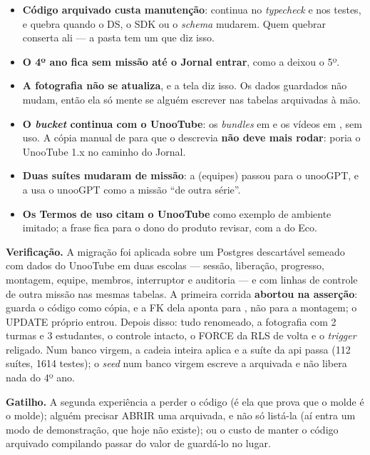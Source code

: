 \begin{itemize}
  \item \textbf{Código arquivado custa manutenção}: continua no \emph{typecheck}
    e nos testes, e quebra quando o DS, o SDK ou o \emph{schema} mudarem. Quem
    quebrar conserta ali --- a pasta tem um  que diz isso.
  \item \textbf{O 4º ano fica sem missão até o Jornal entrar}, como a
     deixou o 5º.
  \item \textbf{A fotografia não se atualiza}, e a tela diz isso. Os dados
    guardados não mudam, então ela só mente se alguém escrever nas tabelas
    arquivadas à mão.
  \item \textbf{O \emph{bucket} continua com o UnooTube}: os \emph{bundles} em
     e os vídeos em , sem uso. A
    cópia manual de  para  que o
     descrevia \textbf{não deve mais rodar}: poria o UnooTube
    1.x no caminho do Jornal.
  \item \textbf{Duas suítes mudaram de missão}: a  (equipes)
    passou para o unooGPT, e a  usa o unooGPT como a missão
    \enquote{de outra série}.
  \item \textbf{Os Termos de uso citam o UnooTube} como exemplo de ambiente
    imitado; a frase fica para o dono do produto revisar, com a do Eco.
\end{itemize}

\textbf{Verificação.} A migração foi aplicada sobre um Postgres descartável
semeado com dados do UnooTube em duas escolas --- sessão, liberação, progresso,
montagem, equipe, membros, interruptor e auditoria --- e com linhas de controle
de outra missão nas mesmas tabelas. A primeira corrida \textbf{abortou na
asserção}:  guarda o código como cópia, e a FK dela aponta
para , não para a montagem; o UPDATE próprio entrou. Depois
disso: tudo renomeado, a fotografia com 2 turmas e 3 estudantes, o controle
intacto, o FORCE da RLS de volta e o \emph{trigger} religado. Num banco virgem,
a cadeia inteira aplica e a suíte da api passa (112 suítes, 1614 testes); o
\emph{seed} num banco virgem escreve a arquivada e não libera nada do 4º ano.

\textbf{Gatilho.} A segunda experiência a perder o código (é ela que prova que o
molde é o molde); alguém precisar ABRIR uma arquivada, e não só listá-la (aí
entra um modo de demonstração, que hoje não existe); ou o custo de manter o
código arquivado compilando passar do valor de guardá-lo no lugar.

